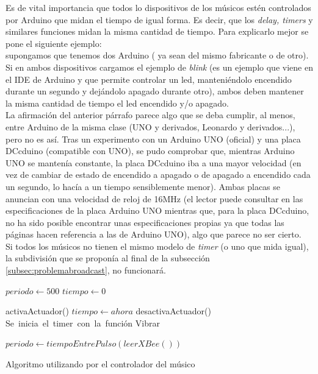 Es de vital importancia que todos lo dispositivos de los músicos estén controlados
por Arduino que midan el tiempo de igual forma. Es decir, que los \textit{delay,
timers} y similares funciones midan la misma cantidad de tiempo. Para explicarlo
mejor se pone el siguiente ejemplo:\\
supongamos que tenemos dos Arduino ( ya sean del mismo fabricante o de otro). Si en ambos dispositivos
cargamos el ejemplo de \textit{blink} \cite{arduinoBlink} (es un ejemplo que viene
en el IDE de Arduino y que permite controlar un led, manteniéndolo encendido durante un segundo
y dejándolo apagado durante otro), ambos deben mantener la misma cantidad de tiempo
el led encendido y/o apagado.\\

La afirmación del anterior párrafo parece algo que se deba cumplir, al menos, entre
Arduino de la misma clase (UNO y derivados, Leonardo y derivados...), pero no es así.
Tras un experimento con un Arduino UNO (oficial) y una placa DCcduino (compatible con UNO),
se pudo comprobar que, mientras Arduino UNO se mantenía constante, la placa DCcduino iba a una
mayor velocidad (en vez de cambiar de estado de encendido a apagado o de apagado a encendido
cada un segundo, lo hacía a un tiempo sensiblemente menor). Ambas placas se anuncian
con una velocidad de reloj de 16MHz (el lector puede consultar en \cite{arduinoUNO} las
especificaciones de la placa Arduino UNO mientras que, para la placa DCcduino, no ha sido
posible encontrar unas especificaciones propias ya que todas las páginas hacen referencia
a las de Arduino UNO), algo que parece no ser cierto.\\

Si todos los músicos no tienen el mismo modelo de \textit{timer} (o uno que mida igual),
la subdivisión que se proponía al final de la subsección \ref{subsec:problemabroadcast},
no funcionará.\\

\begin{algorithm}
  \begin{algorithmic}[1]
    \State $periodo\gets 500$
    \State $tiempo\gets 0$

       \State activaActuador()
       \State $tiempo \gets ahora$
      \Else {}
        \State desactivaActuador()
         \EndIf
     \EndIf
     \EndFunction\\

     \State Se\ inicia\ el\ timer\ con\ la\ función Vibrar

         \State $periodo\gets tiempoEntrePulso(leerXBee())$
      \EndIf
     \EndWhile
  \end{algorithmic}
  \caption{Algoritmo utilizando por el controlador del músico}
\end{algorithm}

